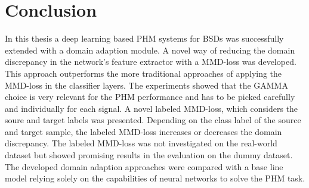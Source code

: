 \chapter{Conclusion}\label{chapter:conclusion}
In this thesis a deep learning based PHM systems for BSDs was successfully extended with a domain adaption module. A novel way of reducing the domain discrepancy in the network's feature extractor with a MMD-loss was developed. This approach outperforms the more traditional approaches of applying the MMD-loss in the classifier layers. The experiments showed that the GAMMA choice is very relevant for the PHM performance and has to be picked carefully and individually for each signal. A novel labeled MMD-loss, which considers the soure and target labels was presented. Depending on the class label of the source and target sample, the labeled MMD-loss increases or decreases the domain discrepancy. The labeled MMD-loss was not investigated on the real-world dataset but showed promising results in the evaluation on the dummy dataset. The developed domain adaption approaches were compared with a base line model relying solely on the capabilities of neural networks to solve the PHM task.
